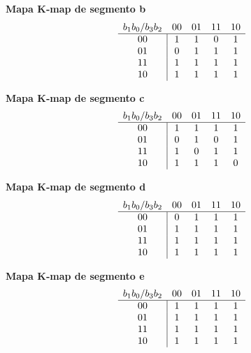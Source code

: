 \documentclass[12pt]{article}
\begin{document}
\noindent
\textbf{Mapa K‐map de segmento \textsf{b}}  
\[
\begin{array}{c|cccc}
\multicolumn{1}{c}{b_1b_0/b_3b_2} & \multicolumn{1}{c}{00} & \multicolumn{1}{c}{01} & \multicolumn{1}{c}{11} & \multicolumn{1}{c}{10} \\
\hline
00 & 1 & 1 & 0 & 1 \\
01       & 0 & 1 & 1 & 1 \\
11       & 1 & 1 & 1 & 1 \\
10       & 1 & 1 & 1 & 1 \\
\end{array}
\]
\vspace{1em}

\noindent
\textbf{Mapa K‐map de segmento \textsf{c}}  
\[
\begin{array}{c|cccc}
\multicolumn{1}{c}{b_1b_0/b_3b_2} & \multicolumn{1}{c}{00} & \multicolumn{1}{c}{01} & \multicolumn{1}{c}{11} & \multicolumn{1}{c}{10} \\
\hline
00 & 1 & 1 & 1 & 1 \\
01       & 0 & 1 & 0 & 1 \\
11       & 1 & 0 & 1 & 1 \\
10       & 1 & 1 & 1 & 0 \\
\end{array}
\]
\vspace{1em}

\noindent
\textbf{Mapa K‐map de segmento \textsf{d}}  
\[
\begin{array}{c|cccc}
\multicolumn{1}{c}{b_1b_0/b_3b_2} & \multicolumn{1}{c}{00} & \multicolumn{1}{c}{01} & \multicolumn{1}{c}{11} & \multicolumn{1}{c}{10} \\
\hline
00 & 0 & 1 & 1 & 1 \\
01       & 1 & 1 & 1 & 1 \\
11       & 1 & 1 & 1 & 1 \\
10       & 1 & 1 & 1 & 1 \\
\end{array}
\]
\vspace{1em}

\noindent
\textbf{Mapa K‐map de segmento \textsf{e}}  
\[
\begin{array}{c|cccc}
\multicolumn{1}{c}{b_1b_0/b_3b_2} & \multicolumn{1}{c}{00} & \multicolumn{1}{c}{01} & \multicolumn{1}{c}{11} & \multicolumn{1}{c}{10} \\
\hline
00 & 1 & 1 & 1 & 1 \\
01       & 1 & 1 & 1 & 1 \\
11       & 1 & 1 & 1 & 1 \\
10       & 1 & 1 & 1 & 1 \\
\end{array}
\]
\vspace{1em}
\end{document}

